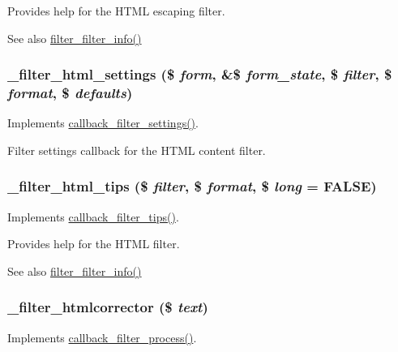 Provides help for the HTML escaping filter.

\begin{DoxySeeAlso}{See also}
\hyperlink{group__standard__filters_ga38089b90576e648c56228ee99c9c1767}{filter\_\-filter\_\-info()} 
\end{DoxySeeAlso}
\hypertarget{group__standard__filters_ga5e2c3faf03f281dc4ad7a4da6591fc3b}{
\subsubsection[{\_\-filter\_\-html\_\-settings}]{\setlength{\rightskip}{0pt plus 5cm}\_\-filter\_\-html\_\-settings (\$ {\em form}, \/  \&\$ {\em form\_\-state}, \/  \$ {\em filter}, \/  \$ {\em format}, \/  \$ {\em defaults})}}
\label{group__standard__filters_ga5e2c3faf03f281dc4ad7a4da6591fc3b}
Implements \hyperlink{group__callbacks_gac9ccfeb3980f8eaa8b3717e98a1e48e2}{callback\_\-filter\_\-settings()}.

Filter settings callback for the HTML content filter. \hypertarget{group__standard__filters_gae86fb7b9514b6c41202c2e2479074b3b}{
\subsubsection[{\_\-filter\_\-html\_\-tips}]{\setlength{\rightskip}{0pt plus 5cm}\_\-filter\_\-html\_\-tips (\$ {\em filter}, \/  \$ {\em format}, \/  \$ {\em long} = {\ttfamily FALSE})}}
\label{group__standard__filters_gae86fb7b9514b6c41202c2e2479074b3b}
Implements \hyperlink{group__callbacks_gabe5ee7c795e0adac0bccb8061006949e}{callback\_\-filter\_\-tips()}.

Provides help for the HTML filter.

\begin{DoxySeeAlso}{See also}
\hyperlink{group__standard__filters_ga38089b90576e648c56228ee99c9c1767}{filter\_\-filter\_\-info()} 
\end{DoxySeeAlso}
\hypertarget{group__standard__filters_ga3cb6607b3259ac8f9a83f317a63e3ec6}{
\subsubsection[{\_\-filter\_\-htmlcorrector}]{\setlength{\rightskip}{0pt plus 5cm}\_\-filter\_\-htmlcorrector (\$ {\em text})}}
\label{group__standard__filters_ga3cb6607b3259ac8f9a83f317a63e3ec6}
Implements \hyperlink{group__callbacks_ga5f82accd878d144a22ea2dfec253f91d}{callback\_\-filter\_\-process()}.

